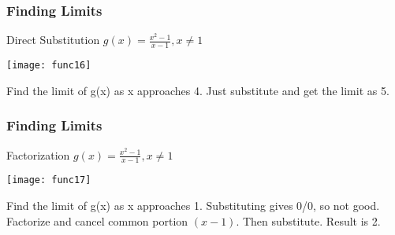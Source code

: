 





 \begin{frame}[fragile]\frametitle{Finding Limits}
Direct Substitution
$g(x) = \frac{x^2 - 1}{x - 1}, x \neq 1$
\begin{center}
\texttt{[image: func16]}
\end{center}
Find the limit of g(x) as x approaches 4. Just substitute and get the limit as 5.
\end{frame}

 \begin{frame}[fragile]\frametitle{Finding Limits}
Factorization
$g(x) = \frac{x^2 - 1}{x - 1}, x \neq 1$
\begin{center}
\texttt{[image: func17]}
\end{center}
Find the limit of g(x) as x approaches 1. Substituting gives 0/0, so not good. Factorize and cancel common portion $(x -1)$. Then substitute. Result is 2.
\end{frame}

